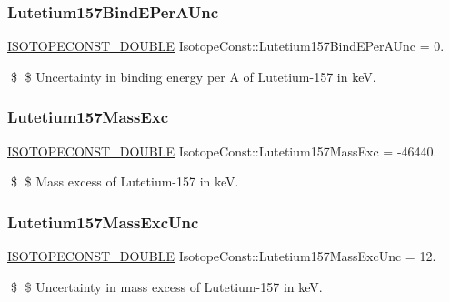 \subsubsection{\texorpdfstring{Lutetium157\+Bind\+E\+Per\+A\+Unc}{Lutetium157BindEPerAUnc}}
{\footnotesize\ttfamily \mbox{\hyperlink{group___isotope_const-_macros_ga8f45a7272ce02c0b4c65c44636ed719a}{I\+S\+O\+T\+O\+P\+E\+C\+O\+N\+S\+T\+\_\+\+D\+O\+U\+B\+LE}} Isotope\+Const\+::\+Lutetium157\+Bind\+E\+Per\+A\+Unc = 0.}

\$ \$ Uncertainty in binding energy per A of Lutetium-\/157 in keV. \mbox{\label{group___isotope_const-_lutetium-_lu157_ga7b54cbda4e1889a6085ef486f64406fc}} 
\subsubsection{\texorpdfstring{Lutetium157\+Mass\+Exc}{Lutetium157MassExc}}
{\footnotesize\ttfamily \mbox{\hyperlink{group___isotope_const-_macros_ga8f45a7272ce02c0b4c65c44636ed719a}{I\+S\+O\+T\+O\+P\+E\+C\+O\+N\+S\+T\+\_\+\+D\+O\+U\+B\+LE}} Isotope\+Const\+::\+Lutetium157\+Mass\+Exc = -\/46440.}

\$ \$ Mass excess of Lutetium-\/157 in keV. \mbox{\label{group___isotope_const-_lutetium-_lu157_ga74d29286a265bbeb415762621e29a711}} 
\subsubsection{\texorpdfstring{Lutetium157\+Mass\+Exc\+Unc}{Lutetium157MassExcUnc}}
{\footnotesize\ttfamily \mbox{\hyperlink{group___isotope_const-_macros_ga8f45a7272ce02c0b4c65c44636ed719a}{I\+S\+O\+T\+O\+P\+E\+C\+O\+N\+S\+T\+\_\+\+D\+O\+U\+B\+LE}} Isotope\+Const\+::\+Lutetium157\+Mass\+Exc\+Unc = 12.}

\$ \$ Uncertainty in mass excess of Lutetium-\/157 in keV. \mbox{\label{group___isotope_const-_lutetium-_lu157_gaf7f0b42f5af3af336efdc4f48841b4c6}} 

